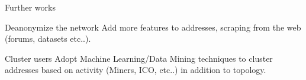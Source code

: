 \documentclass{beamer}
\begin{document}
\begin{frame}{Further works}
    \begin{block}{Deanonymize the network}
        Add more features to addresses, scraping from the web (forums, datasets etc..).
    \end{block}

    \vskip 1cm

    \begin{block}{Cluster users}
        Adopt Machine Learning/Data Mining techniques to cluster addresses based on activity (Miners, ICO, etc..) in addition to topology.
    \end{block}
\end{frame}
\end{document}
